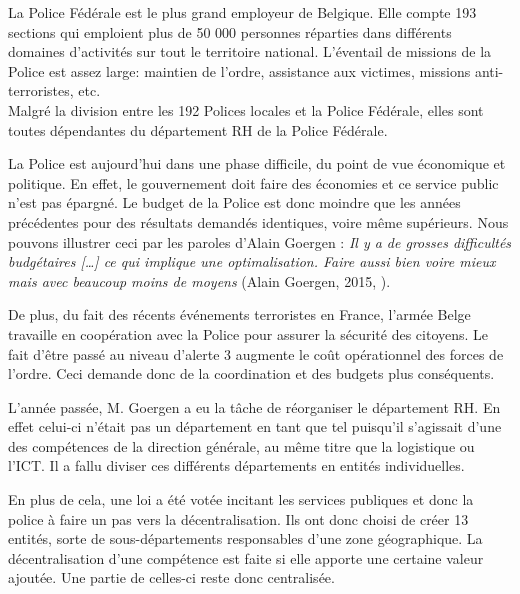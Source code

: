 La Police Fédérale est le plus grand employeur de Belgique. Elle compte 193 sections qui emploient plus de 50 000 personnes réparties dans différents domaines d'activités sur tout le territoire national. L'éventail de missions de la Police est assez large: maintien de l'ordre, assistance aux victimes, missions anti-terroristes, etc.\\
Malgré la division entre les 192 Polices locales et la Police Fédérale, elles sont toutes dépendantes du département RH de la Police Fédérale.\newline
 
La Police est aujourd'hui dans une phase difficile, du point de vue économique et politique. En effet, le gouvernement doit faire des économies et ce service public n'est pas épargné. Le budget de la Police est donc moindre que les années précédentes %
 pour des résultats demandés identiques, voire même supérieurs. Nous pouvons illustrer ceci par les paroles d'Alain Goergen : \textit{\og Il y a de grosses difficultés budgétaires [\ldots] ce qui implique une optimalisation. Faire aussi bien voire mieux mais avec beaucoup moins de moyens \fg{}} (Alain Goergen, 2015, \cite{tableronde}). \newline

De plus, du fait des récents événements terroristes en France, l'armée Belge travaille en coopération avec la Police pour assurer la sécurité des citoyens. Le fait d'être passé au niveau d'alerte 3 augmente le coût opérationnel des forces de l'ordre. Ceci demande donc de la coordination et des budgets plus conséquents. \newline

L'année passée, M. Goergen a eu la tâche de réorganiser le département RH. En effet celui-ci n'était pas un département en tant que tel puisqu'il s'agissait d'une des compétences de la direction générale, au même titre que la logistique ou l'ICT. Il a fallu diviser ces différents départements en entités individuelles.\newline

En plus de cela, une loi a été votée incitant les services publiques et donc la police à faire un pas vers la décentralisation. Ils ont donc choisi de créer 13 entités, sorte de sous-départements responsables d'une zone géographique. La décentralisation d'une compétence est faite si elle apporte une certaine valeur ajoutée. Une partie de celles-ci reste donc centralisée.\newline

